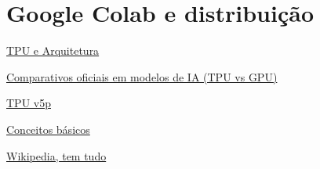 \documentclass{article}
\begin{document}
\section{Google Colab e distribuição}




\href{https://www.run.ai/guides/cloud-deep-learning/google-tpu}{TPU e Arquitetura}

\href{https://cloud.google.com/blog/products/compute/performance-per-dollar-of-gpus-and-tpus-for-ai-inference}{Comparativos oficiais em modelos de IA (TPU vs GPU)}

\href{https://canaltech.com.br/inteligencia-artificial/cloud-tpu-v5p-e-o-novo-e-mais-poderoso-acelerador-de-ia-do-google-272299/}{TPU v5p}

\href{https://cloud.google.com/tpu?hl=pt-BR}{Conceitos básicos}

\href{https://en.wikipedia.org/wiki/Tensor_Processing_Unit}{Wikipedia, tem tudo}
\end{document}
